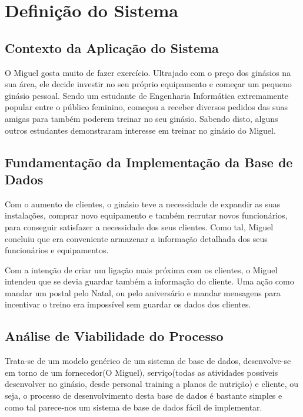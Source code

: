 \chapter{Definição do Sistema}
\section{Contexto da Aplicação do Sistema}

O Miguel gosta muito de fazer exercício. Ultrajado com o preço dos ginásios na sua área, ele decide investir no seu próprio equipamento e começar um pequeno ginásio pessoal. Sendo um estudante de Engenharia Informática extremamente popular entre o público feminino, começou a receber diversos pedidos das suas amigas para também poderem treinar no seu ginásio. Sabendo disto, alguns outros estudantes demonstraram interesse em treinar no ginásio do Miguel. 

\section{ Fundamentação da Implementação da Base de Dados}
 Com o aumento de clientes, o ginásio teve a necessidade de expandir as suas instalações, comprar novo equipamento e também recrutar novos funcionários, para conseguir satisfazer a necessidade dos seus clientes.
 Como tal, Miguel concluiu que era conveniente armazenar a informação detalhada dos seus funcionários e equipamentos.
 \par Com a intenção de criar um ligação mais próxima com os clientes, o Miguel intendeu que se devia guardar também a informação do cliente. Uma ação como mandar um postal pelo Natal, ou pelo aniversário e mandar mensagens para incentivar o treino era impossível sem guardar os dados dos clientes.
\section{Análise de Viabilidade do Processo}
Trata-se de um modelo genérico de um sistema de base de dados, desenvolve-se em torno de um fornecedor(O Miguel), serviço(todas as atividades possíveis desenvolver no ginásio, desde personal training a planos de nutrição) e cliente, ou seja, o processo de desenvolvimento desta base de dados é bastante simples e como tal parece-nos um sistema de base de dados fácil de implementar.
